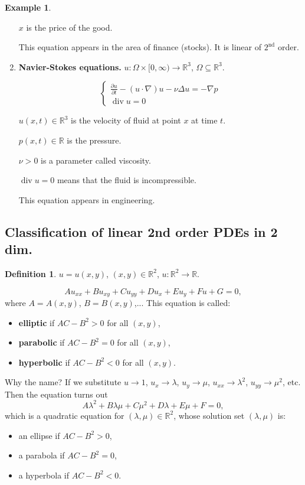 \documentclass[12pt]{article}
\DeclareMathOperator{\diver}{div}
\theoremstyle{definition}
\newtheorem*{definition*}{Definition}
\newtheorem*{example*}{Example}
\begin{document}
\begin{example*}
\begin{enumerate}[label=\alph*)]
$x$ is the price of the good.

This equation appears in the area of finance (stocks). It is linear of $2^\text{nd}$ order.

\item \textbf{Navier-Stokes equations.} $u:\Omega\times[0,\infty)\rightarrow\mathbb R^3$, $\Omega\subseteq\mathbb R^3$.

\[\left\{\begin{array}{l}\displaystyle{\frac{\partial u}{\partial t}-(u\cdot\nabla)u-\nu\Delta u=-\nabla p}\\\diver u=0\end{array}\right.\]

$u(x,t)\in\mathbb R^3$ is the velocity of fluid at point $x$ at time $t$.

$p(x,t)\in\mathbb R$ is the pressure.

$\nu>0$ is a parameter called viscosity.

$\diver u=0$ means that the fluid is incompressible.

This equation appears in engineering.
\end{enumerate}
\end{example*}

\subsection*{Classification of linear 2nd order PDEs in 2 dim.}

\begin{definition*}
$u=u(x,y)$, $(x,y)\in\mathbb R^2$, $u:\mathbb R^2\rightarrow\mathbb R$.

\[Au_{xx}+Bu_{xy}+Cu_{yy}+Du_x+Eu_y+Fu+G=0,\]
where $A=A(x,y)$, $B=B(x,y)$,... This equation is called:
\begin{itemize}
\item \textbf{elliptic} if $AC-B^2>0$ for all $(x,y)$,
\item \textbf{parabolic} if $AC-B^2=0$ for all $(x,y)$,
\item \textbf{hyperbolic} if $AC-B^2<0$ for all $(x,y)$.
\end{itemize}
\end{definition*}

Why the name? If we substitute $u\to1$, $u_x\to\lambda$, $u_y\to\mu$, $u_{xx}\to\lambda^2$, $u_{yy}\to\mu^2$, etc. Then the equation turns out
\[A\lambda^2+B\lambda\mu+C\mu^2+D\lambda+E\mu+F=0,\]
which is a quadratic equation for $(\lambda,\mu)\in\mathbb R^2$, whose solution set $(\lambda,\mu)$ is:
\begin{itemize}
\item an ellipse if $AC-B^2>0$,
\item a parabola if $AC-B^2=0$,
\item a hyperbola if $AC-B^2<0$.
\end{itemize}
\end{document}
